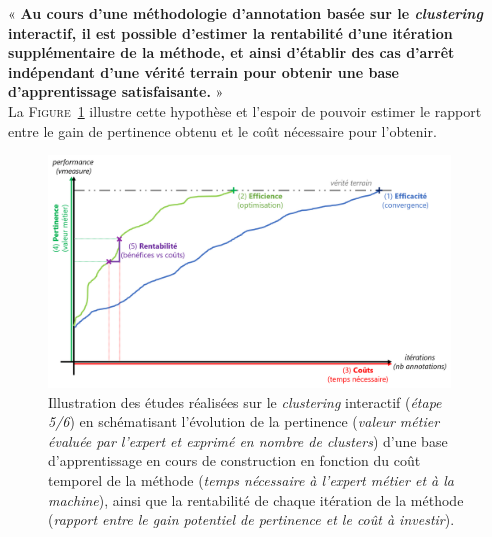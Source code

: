 	\begin{tcolorbox}[
		title=\faVial~\textbf{Hypothèse de rentabilité}~\faVial,
		colback=colorTcolorboxHypothesis!15,
		colframe=colorTcolorboxHypothesis!75,
		width=\linewidth
	]
		« \textbf{
			Au cours d'une méthodologie d'annotation basée sur le \textit{clustering} interactif, il est possible d'estimer la rentabilité d'une itération supplémentaire de la méthode, et ainsi d'établir des cas d'arrêt indépendant d'une vérité terrain pour obtenir une base d’apprentissage satisfaisante.
		} » \\
		
		La \textsc{Figure~\ref{figure:4.5-HYPOTHESE-RENTABILITE}} illustre cette hypothèse et l'espoir de pouvoir estimer le rapport entre le gain de pertinence obtenu et le coût nécessaire pour l'obtenir.
		\begin{figure}[H]  %
			\centering
			\includegraphics[width=0.95\textwidth]{figures/hypotheses-05-rentabilite}
			\caption{Illustration des études réalisées sur le \textit{clustering} interactif (\textit{étape 5/6}) en schématisant l'évolution de la pertinence (\textit{valeur métier évaluée par l'expert et exprimé en nombre de clusters}) d'une base d'apprentissage en cours de construction en fonction du coût temporel de la méthode (\textit{temps nécessaire à l'expert métier et à la machine}), ainsi que la rentabilité de chaque itération de la méthode (\textit{rapport entre le gain potentiel de pertinence et le coût à investir}).}
			\label{figure:4.5-HYPOTHESE-RENTABILITE}
		\end{figure}

	\end{tcolorbox}
		
